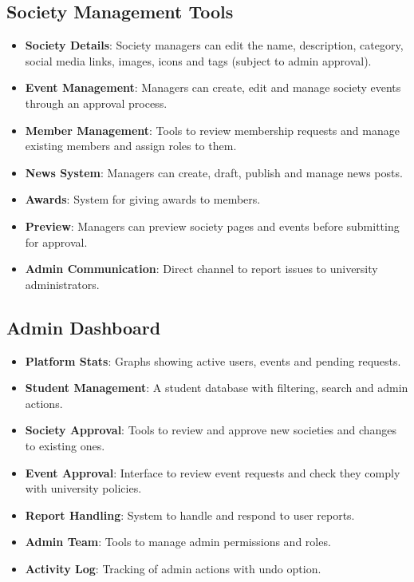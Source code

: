 \subsection{Society Management Tools}
\begin{itemize}
    \item \textbf{Society Details}: Society managers can edit the name, description, category, social media links, images, icons and tags (subject to admin approval).
    \item \textbf{Event Management}: Managers can create, edit and manage society events through an approval process.
    \item \textbf{Member Management}: Tools to review membership requests and manage existing members and assign roles to them.
    \item \textbf{News System}: Managers can create, draft, publish and manage news posts.
    \item \textbf{Awards}: System for giving awards to members.
    \item \textbf{Preview}: Managers can preview society pages and events before submitting for approval.
    \item \textbf{Admin Communication}: Direct channel to report issues to university administrators.
\end{itemize}

\subsection{Admin Dashboard}
\begin{itemize}
    \item \textbf{Platform Stats}: Graphs showing active users, events and pending requests.
    \item \textbf{Student Management}: A student database with filtering, search and admin actions.
    \item \textbf{Society Approval}: Tools to review and approve new societies and changes to existing ones.
    \item \textbf{Event Approval}: Interface to review event requests and check they comply with university policies.
    \item \textbf{Report Handling}: System to handle and respond to user reports.
    \item \textbf{Admin Team}: Tools to manage admin permissions and roles.
    \item \textbf{Activity Log}: Tracking of admin actions with undo option.
\end{itemize}

